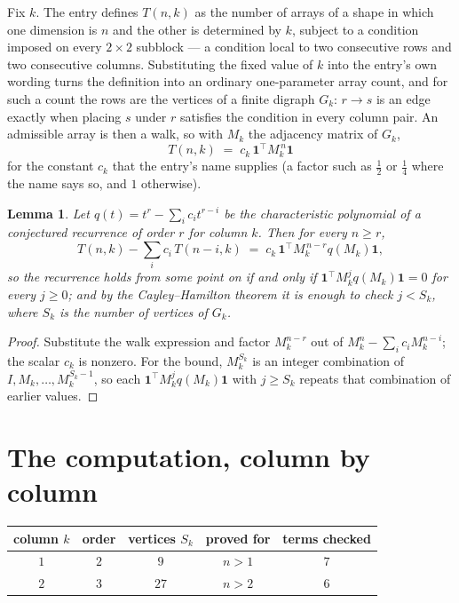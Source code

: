\documentclass[11pt,a4paper]{article}
\theoremstyle{plain}
\newtheorem{lemma}[theorem]{Lemma}
\theoremstyle{definition}
\begin{document}
Fix $k$. The entry defines $T(n,k)$ as the number of arrays of a shape in which one dimension
is $n$ and the other is determined by $k$, subject to a condition imposed on every
$2\times2$ subblock --- a condition local to two consecutive rows and two consecutive columns.
Substituting the fixed value of $k$ into the entry's own wording turns the definition into an
ordinary one-parameter array count, and for such a count the rows are the vertices of a finite
digraph $G_k$: $r\to s$ is an edge exactly when placing $s$ under $r$ satisfies the condition
in every column pair. An admissible array is then a walk, so with $M_k$ the adjacency matrix
of $G_k$,
\[
T(n,k)\;=\;c_k\,\mathbf{1}^{\!\top}M_k^{\,n}\mathbf{1}
\]
for the constant $c_k$ that the entry's name supplies (a factor such as $\tfrac12$ or
$\tfrac14$ where the name says so, and $1$ otherwise).

\begin{lemma}\label{lem:crit}
Let $q(t)=t^{r}-\sum_i c_it^{r-i}$ be the characteristic polynomial of a conjectured
recurrence of order $r$ for column $k$. Then for every $n\ge r$,
\[
T(n,k)-\sum_i c_i\,T(n-i,k)\;=\;c_k\,\mathbf{1}^{\!\top}M_k^{\,n-r}q(M_k)\mathbf{1},
\]
so the recurrence holds from some point on if and only if
$\mathbf{1}^{\!\top}M_k^{j}q(M_k)\mathbf{1}=0$ for every $j\ge0$; and by the
Cayley--Hamilton theorem it is enough to check $j<S_k$, where $S_k$ is the number of vertices
of $G_k$.
\end{lemma}

\begin{proof}
Substitute the walk expression and factor $M_k^{n-r}$ out of $M_k^{n}-\sum_ic_iM_k^{n-i}$;
the scalar $c_k$ is nonzero. For the bound, $M_k^{S_k}$ is an integer combination of
$I,M_k,\dots,M_k^{S_k-1}$, so each $\mathbf{1}^{\!\top}M_k^{j}q(M_k)\mathbf{1}$ with
$j\ge S_k$ repeats that combination of earlier values.
\end{proof}

\section{The computation, column by column}

\begin{center}
\begin{tabular}{ccccc}
column $k$ & order & vertices $S_k$ & proved for & terms checked \\ \hline
$1$ & $2$ & $9$ & $n>1$ & $7$ \\
$2$ & $3$ & $27$ & $n>2$ & $6$ \\
\end{tabular}
\end{center}
\end{document}
